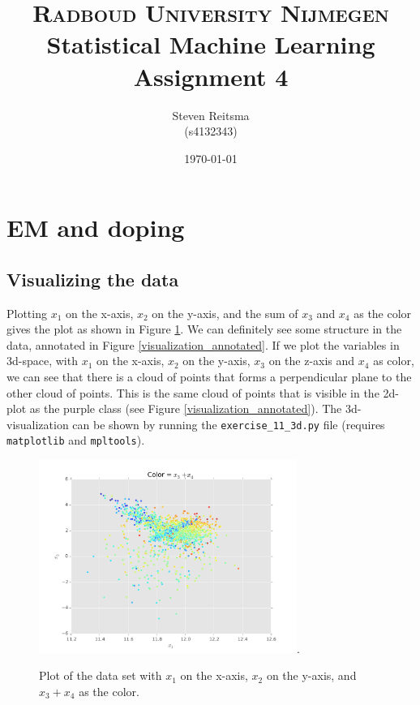\documentclass[paper=a4, fontsize=10pt]{scrartcl} %
\title{	
\normalfont \normalsize 
\textsc{Radboud University Nijmegen}  %
\horrule{0.5pt} \\[0.3cm] %
\huge Statistical Machine Learning \\ Assignment 4 \\ %
\horrule{2pt}  %
}
\author{Steven Reitsma \\ (s4132343)} %
\date{\normalsize\today} %
\numberwithin{equation}{section} %
\numberwithin{figure}{section} %
\numberwithin{table}{section} %
\begin{document}
\maketitle %

\section{EM and doping}
\subsection{Visualizing the data}
Plotting $x_1$ on the x-axis, $x_2$ on the y-axis, and the sum of $x_3$ and $x_4$ as the color gives the plot as shown in Figure \ref{visualization}. We can definitely see some structure in the data, annotated in Figure \ref{visualization_annotated}. If we plot the variables in 3d-space, with $x_1$ on the x-axis, $x_2$ on the y-axis, $x_3$ on the z-axis and $x_4$ as color, we can see that there is a cloud of points that forms a perpendicular plane to the other cloud of points. This is the same cloud of points that is visible in the 2d-plot as the purple class (see Figure \ref{visualization_annotated}). The 3d-visualization can be shown by running the \verb|exercise_11_3d.py| file (requires \verb|matplotlib| and \verb|mpltools|).

\begin{figure}[h!]
	\centering
	\includegraphics[width=0.75\textwidth]{exercise_11.pdf}.
	\caption{Plot of the data set with $x_1$ on the x-axis, $x_2$ on the y-axis, and $x_3 + x_4$ as the color.}
	\label{visualization}
\end{figure}
\end{document}
